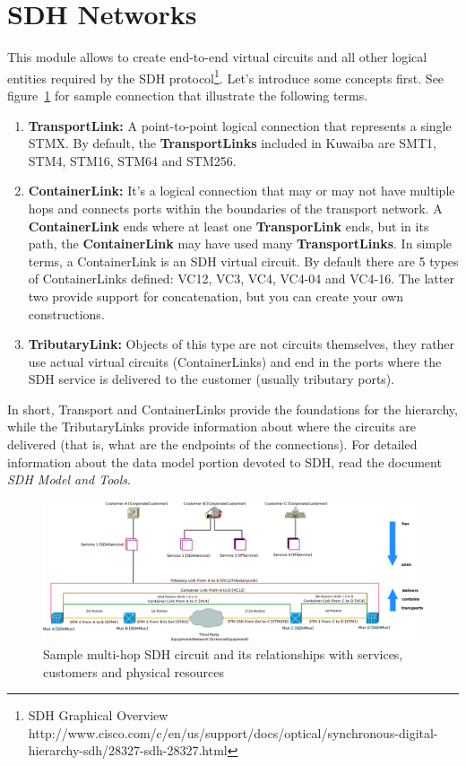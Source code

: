 \documentclass[a4paper]{article}
\begin{document}
	\section{SDH Networks}
		This module allows to create end-to-end virtual circuits and all other logical entities required by the SDH protocol\footnote{SDH Graphical Overview http://www.cisco.com/c/en/us/support/docs/optical/synchronous-digital-hierarchy-sdh/28327-sdh-28327.html}. Let's introduce some concepts first. See figure~\ref{fig:sdh_module_description} for sample connection that illustrate the following terms.
		\begin{enumerate}
			\item \textbf{TransportLink:} A point-to-point logical connection that represents a single STMX. By default, the \textbf{TransportLinks} included in Kuwaiba are SMT1, STM4, STM16, STM64 and STM256.
			\item \textbf{ContainerLink:} It's a  logical connection that may or may not have multiple hops and connects ports within the boundaries of the transport network. A \textbf{ContainerLink} ends where at least one \textbf{TransporLink} ends, but in its path, the \textbf{ContainerLink} may have used many \textbf{TransportLinks}. In simple terms, a ContainerLink is an SDH virtual circuit. By default there are 5 types of ContainerLinks defined: VC12, VC3, VC4, VC4-04 and VC4-16. The latter two provide support for concatenation, but you can create your own constructions.
			\item \textbf{TributaryLink:} Objects of this type are not circuits themselves, they rather use actual virtual circuits (ContainerLinks) and end in the ports where the SDH service is delivered to the customer (usually tributary ports).
		\end{enumerate}
		In short, Transport and ContainerLinks provide the foundations for the hierarchy, while the TributaryLinks provide information about where the circuits are delivered (that is, what are the endpoints of the connections). For detailed information about the data model portion devoted to SDH, read the document \textit{SDH Model and Tools}.
		\newpage
		\begin{landscape}
			\begin{figure}
				\centering
				\includegraphics[width=\linewidth]{img/sdh_module_description.png}
				\caption{Sample multi-hop SDH circuit and its relationships with services, customers and physical resources}
				\label{fig:sdh_module_description}
			\end{figure}
		\end{landscape}
\end{document}
